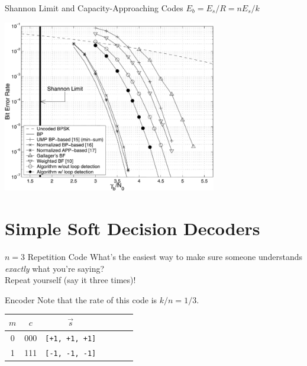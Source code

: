 \documentclass[aspectratio=1610, 10pt]{beamer}
\begin{document}
\begin{frame}[label={sec:orgc077cf1}]{Shannon Limit and Capacity-Approaching Codes}
\(E_b = E_s/R = nE_s/k\)
\begin{center}
\includegraphics[width=0.7\textwidth]{./ldpc_ber_snr.png}
\end{center}
\end{frame}

\section{Simple Soft Decision Decoders}
\label{sec:orgb68b010}

\begin{frame}[label={sec:org3c74cf0}]{\(n=3\) Repetition Code}
What's the easiest way to make sure someone understands \emph{exactly} what
you're saying?\\

Repeat yourself (say it three times)!
\end{frame}

\begin{frame}[label={sec:org8a1352f},fragile]{Encoder}
 Note that the rate of this code is \(k/n = 1/3\).
\begin{center}
\begin{tabular}{ccccccc}
\toprule
\(m\) & \(c\) & \(\vec{s}\)\\
\midrule
0 & 000 & \texttt{[+1, +1, +1]}\\
1 & 111 & \texttt{[-1, -1, -1]}\\
\bottomrule
\end{tabular}

\end{center}
\end{frame}
\end{document}
